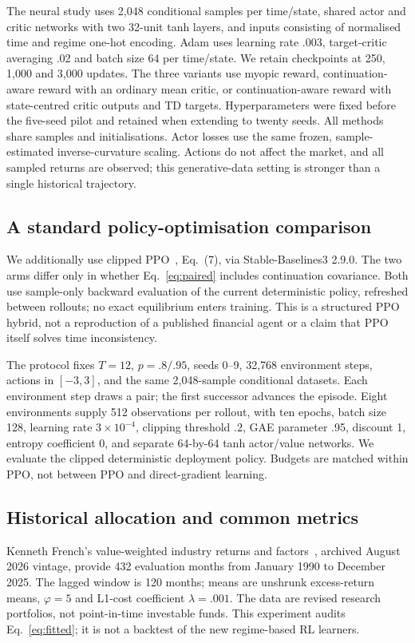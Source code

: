 \documentclass[sigconf,anonymous,review]{acmart}
\begin{document}
The neural study uses 2,048 conditional samples per time/state, shared actor and critic networks with two 32-unit tanh layers, and inputs consisting of normalised time and regime one-hot encoding. Adam uses learning rate .003, target-critic averaging .02 and batch size 64 per time/state. We retain checkpoints at 250, 1,000 and 3,000 updates. The three variants use myopic reward, continuation-aware reward with an ordinary mean critic, or continuation-aware reward with state-centred critic outputs and TD targets. Hyperparameters were fixed before the five-seed pilot and retained when extending to twenty seeds. All methods share samples and initialisations. Actor losses use the same frozen, sample-estimated inverse-curvature scaling. Actions do not affect the market, and all sampled returns are observed; this generative-data setting is stronger than a single historical trajectory.

\subsection{A standard policy-optimisation comparison}
We additionally use clipped PPO~\cite{schulman2017}, Eq.~(7), via Stable-Baselines3 2.9.0. The two arms differ only in whether Eq.~\eqref{eq:paired} includes continuation covariance. Both use sample-only backward evaluation of the current deterministic policy, refreshed between rollouts; no exact equilibrium enters training. This is a structured PPO hybrid, not a reproduction of a published financial agent or a claim that PPO itself solves time inconsistency.

The protocol fixes $T=12$, $p=.8/.95$, seeds 0--9, 32,768 environment steps, actions in $[-3,3]$, and the same 2,048-sample conditional datasets. Each environment step draws a pair; the first successor advances the episode. Eight environments supply 512 observations per rollout, with ten epochs, batch size 128, learning rate $3\times10^{-4}$, clipping threshold .2, GAE parameter .95, discount 1, entropy coefficient 0, and separate 64-by-64 tanh actor/value networks. We evaluate the clipped deterministic deployment policy. Budgets are matched within PPO, not between PPO and direct-gradient learning.

\subsection{Historical allocation and common metrics}
Kenneth French's value-weighted industry returns and factors~\cite{french}, archived August 2026 vintage, provide 432 evaluation months from January 1990 to December 2025. The lagged window is 120 months; means are unshrunk excess-return means, $\varphi=5$ and L1-cost coefficient $\lambda=.001$. The data are revised research portfolios, not point-in-time investable funds. This experiment audits Eq.~\eqref{eq:fitted}; it is not a backtest of the new regime-based RL learners.
\end{document}
